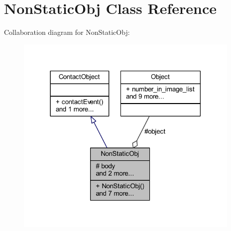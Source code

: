 \hypertarget{class_non_static_obj}{}\section{Non\+Static\+Obj Class Reference}
\label{class_non_static_obj}


Collaboration diagram for Non\+Static\+Obj\+:\nopagebreak
\begin{figure}[H]
\begin{center}
\leavevmode
\includegraphics[width=306pt]{class_non_static_obj__coll__graph}
\end{center}
\end{figure}
